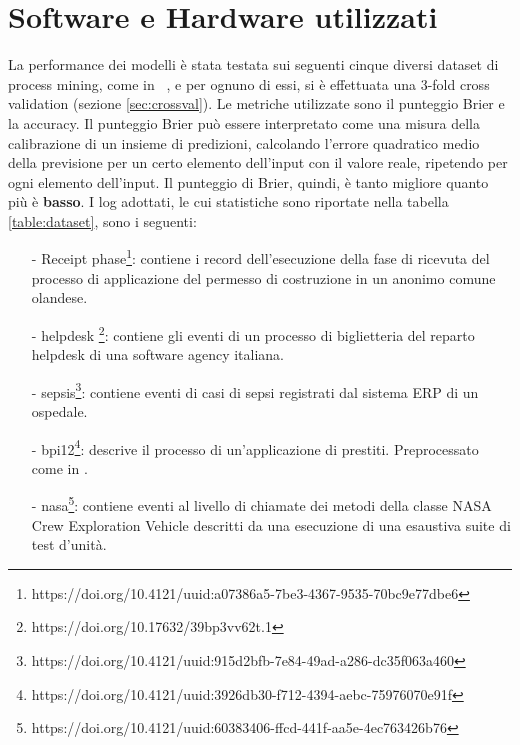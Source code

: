 \documentclass[12pt,a4paper]{report}
\begin{document}
    \section{Software e Hardware utilizzati}
    La performance dei modelli \`e stata testata sui seguenti cinque 
    diversi dataset di process mining, come in 
    ~\cite{10.1007/978-3-030-35166-3_25}, e per ognuno di essi, si \`e 
    effettuata una 3-fold cross validation (sezione \ref{sec:crossval}).
    Le metriche utilizzate sono il punteggio Brier e la accuracy. Il 
    punteggio Brier pu\`o essere interpretato come una misura della 
    calibrazione di un insieme di predizioni, calcolando l'errore 
    quadratico medio della previsione per un certo elemento dell'input 
    con il valore reale, ripetendo per ogni elemento dell'input. Il
    punteggio di Brier, quindi, \`e tanto migliore quanto pi\`u \`e 
    \textbf{basso}. I log adottati, le cui statistiche sono riportate nella tabella
    \ref{table:dataset}, sono i seguenti:
    \begin{itemize}
        \item[-] Receipt phase\footnote{https://doi.org/10.4121/uuid:a07386a5-7be3-4367-9535-70bc9e77dbe6}: contiene i record dell'esecuzione
            della fase di ricevuta del processo di applicazione
            del permesso di costruzione in un anonimo comune olandese.
        \item[-] helpdesk
            \footnote{https://doi.org/10.17632/39bp3vv62t.1}: 
            contiene gli eventi di un processo di biglietteria del 
            reparto helpdesk di una software agency italiana.
        \item[-] sepsis\footnote{https://doi.org/10.4121/uuid:915d2bfb-7e84-49ad-a286-dc35f063a460}: 
            contiene eventi di casi di sepsi registrati dal sistema ERP
            di un ospedale.
          \item[-] bpi12\footnote{https://doi.org/10.4121/uuid:3926db30-f712-4394-aebc-75976070e91f}:
            descrive il processo di un'applicazione di prestiti. 
            Preprocessato come in \cite{pred-bpm-lstm}.
          \item[-] nasa\footnote{https://doi.org/10.4121/uuid:60383406-ffcd-441f-aa5e-4ec763426b76}:
            contiene eventi al livello di chiamate dei metodi della
            classe NASA Crew Exploration Vehicle descritti da una
            esecuzione di una esaustiva suite di test d'unit\`a.
    \end{itemize}
\end{document}
